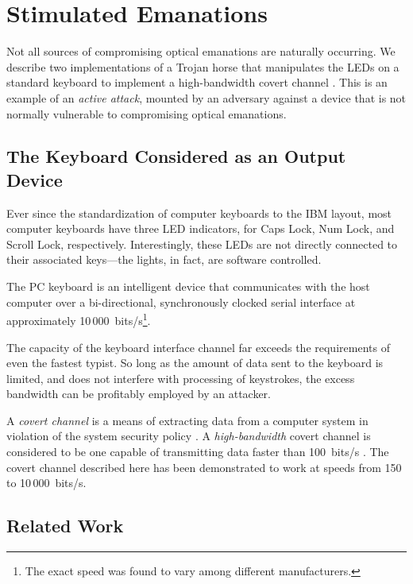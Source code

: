 \documentclass{acmtrans2e}
\begin{document}
\section{Stimulated Emanations}\label{appendix:covert_channel}

Not all sources of compromising optical emanations are naturally 
occurring.  We describe two implementations of a Trojan horse that 
manipulates the LEDs on a standard keyboard to implement a
high-bandwidth covert channel \cite{wray}.  This is an example of an
{\it active attack}, mounted by an adversary against a device
that is not normally vulnerable to compromising optical emanations.

\subsection{The Keyboard Considered as an Output Device}

Ever since the standardization of computer keyboards to the IBM layout, 
most computer keyboards have three LED indicators, for Caps Lock, 
Num Lock, and Scroll Lock, respectively.  Interestingly, these LEDs are
not directly connected to their associated keys---the lights, in fact,
are software controlled.

The PC keyboard is an intelligent device that communicates with the host 
computer over a bi-directional, synchronously clocked serial interface at 
approximately 10\,000~bits/s\footnote{The exact speed was found 
to vary among different manufacturers.}.

The capacity of the keyboard interface channel far exceeds the 
requirements of even the fastest typist.  So long as the amount of data 
sent to the keyboard is limited, and does not interfere with processing 
of keystrokes, the excess bandwidth can be profitably employed by an 
attacker.

A {\it covert channel} is a means of extracting data from a computer 
system in violation of the system security policy
\cite{lampson,ncsc_covert_channels_book}.  A 
{\it high-bandwidth} covert channel is considered to be one capable of 
transmitting data faster than 100~bits/s
\cite{common_criteria,orange_book}.  The covert channel described here
has been demonstrated to work at speeds from 150 to 10\,000~bits/s.

\subsection{Related Work}
\end{document}
